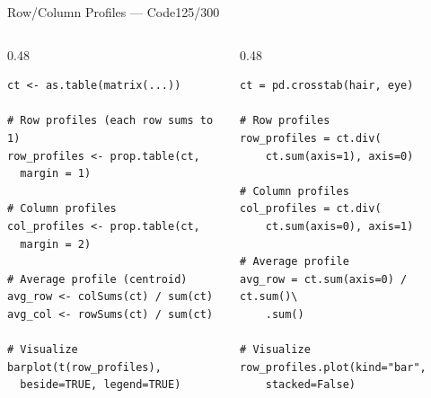 \documentclass[10pt]{beamer}
\newcommand{\smark}[1]{\hfill{\scriptsize\color{codegray}#1}}
\begin{document}
\begin{frame}[fragile]{Row/Column Profiles --- Code}\smark{125/300}
\begin{columns}[T]
\begin{column}{0.48\textwidth}
\begin{lstlisting}[style=Rstyle]
ct <- as.table(matrix(...))

# Row profiles (each row sums to 1)
row_profiles <- prop.table(ct,
  margin = 1)

# Column profiles
col_profiles <- prop.table(ct,
  margin = 2)

# Average profile (centroid)
avg_row <- colSums(ct) / sum(ct)
avg_col <- rowSums(ct) / sum(ct)

# Visualize
barplot(t(row_profiles),
  beside=TRUE, legend=TRUE)
\end{lstlisting}
\end{column}
\begin{column}{0.48\textwidth}
\begin{lstlisting}[style=Pystyle]
ct = pd.crosstab(hair, eye)

# Row profiles
row_profiles = ct.div(
    ct.sum(axis=1), axis=0)

# Column profiles
col_profiles = ct.div(
    ct.sum(axis=0), axis=1)

# Average profile
avg_row = ct.sum(axis=0) / ct.sum()\
    .sum()

# Visualize
row_profiles.plot(kind="bar",
    stacked=False)
\end{lstlisting}
\end{column}
\end{columns}
\end{frame}
\end{document}
